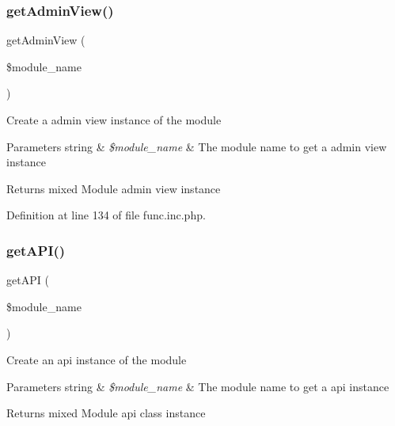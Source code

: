 \hypertarget{func_8inc_8php_a194629ccc05f325c64834925b05d0941}{}\label{func_8inc_8php_a194629ccc05f325c64834925b05d0941} 
\subsubsection{\texorpdfstring{get\+Admin\+View()}{getAdminView()}}
{\footnotesize\ttfamily get\+Admin\+View (\begin{DoxyParamCaption}\item[{}]{\$module\+\_\+name }\end{DoxyParamCaption})}

Create a admin view instance of the module


\begin{DoxyParams}[1]{Parameters}
string & {\em \$module\+\_\+name} & The module name to get a admin view instance \\
\hline
\end{DoxyParams}
\begin{DoxyReturn}{Returns}
mixed Module admin view instance 
\end{DoxyReturn}


Definition at line 134 of file func.\+inc.\+php.

\hypertarget{func_8inc_8php_a12c822fc3e002eb1c58c58001db7ac88}{}\label{func_8inc_8php_a12c822fc3e002eb1c58c58001db7ac88} 
\subsubsection{\texorpdfstring{get\+A\+P\+I()}{getAPI()}}
{\footnotesize\ttfamily get\+A\+PI (\begin{DoxyParamCaption}\item[{}]{\$module\+\_\+name }\end{DoxyParamCaption})}

Create an api instance of the module


\begin{DoxyParams}[1]{Parameters}
string & {\em \$module\+\_\+name} & The module name to get a api instance \\
\hline
\end{DoxyParams}
\begin{DoxyReturn}{Returns}
mixed Module api class instance 
\end{DoxyReturn}


